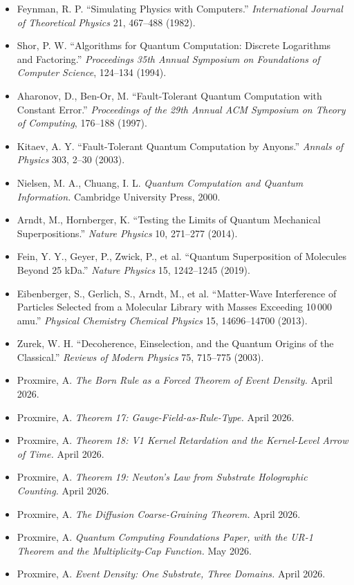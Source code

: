 \documentclass[11pt,a4paper]{article}
\begin{document}
\begin{itemize}[leftmargin=*,itemsep=2pt]
  \item Feynman, R. P. ``Simulating Physics with Computers.'' \emph{International Journal of Theoretical Physics} 21, 467--488 (1982).
  \item Shor, P. W. ``Algorithms for Quantum Computation: Discrete Logarithms and Factoring.'' \emph{Proceedings 35th Annual Symposium on Foundations of Computer Science}, 124--134 (1994).
  \item Aharonov, D., Ben-Or, M. ``Fault-Tolerant Quantum Computation with Constant Error.'' \emph{Proceedings of the 29th Annual ACM Symposium on Theory of Computing}, 176--188 (1997).
  \item Kitaev, A. Y. ``Fault-Tolerant Quantum Computation by Anyons.'' \emph{Annals of Physics} 303, 2--30 (2003).
  \item Nielsen, M. A., Chuang, I. L. \emph{Quantum Computation and Quantum Information.} Cambridge University Press, 2000.
  \item Arndt, M., Hornberger, K. ``Testing the Limits of Quantum Mechanical Superpositions.'' \emph{Nature Physics} 10, 271--277 (2014).
  \item Fein, Y. Y., Geyer, P., Zwick, P., et al. ``Quantum Superposition of Molecules Beyond 25 kDa.'' \emph{Nature Physics} 15, 1242--1245 (2019).
  \item Eibenberger, S., Gerlich, S., Arndt, M., et al. ``Matter-Wave Interference of Particles Selected from a Molecular Library with Masses Exceeding 10\,000 amu.'' \emph{Physical Chemistry Chemical Physics} 15, 14696--14700 (2013).
  \item Zurek, W. H. ``Decoherence, Einselection, and the Quantum Origins of the Classical.'' \emph{Reviews of Modern Physics} 75, 715--775 (2003).
  \item Proxmire, A. \emph{The Born Rule as a Forced Theorem of Event Density.} April 2026.
  \item Proxmire, A. \emph{Theorem 17: Gauge-Field-as-Rule-Type.} April 2026.
  \item Proxmire, A. \emph{Theorem 18: V1 Kernel Retardation and the Kernel-Level Arrow of Time.} April 2026.
  \item Proxmire, A. \emph{Theorem 19: Newton's Law from Substrate Holographic Counting.} April 2026.
  \item Proxmire, A. \emph{The Diffusion Coarse-Graining Theorem.} April 2026.
  \item Proxmire, A. \emph{Quantum Computing Foundations Paper, with the UR-1 Theorem and the Multiplicity-Cap Function.} May 2026.
  \item Proxmire, A. \emph{Event Density: One Substrate, Three Domains.} April 2026.
\end{itemize}
\end{document}
